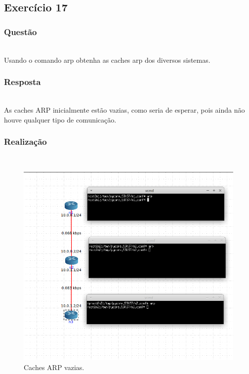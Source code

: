 \documentclass{llncs}
\begin{document}
\clearpage
\subsection{Exercício 17}
\subsubsection{Questão}\rule[-10pt]{0pt}{10pt}\\

Usando o comando arp obtenha as caches arp dos diversos sistemas.

\subsubsection{Resposta}\rule[-10pt]{0pt}{10pt}\\

As caches ARP inicialmente estão vazias, como seria de esperar, pois ainda não houve qualquer tipo de comunicação.

\subsubsection{Realização}\rule[-10pt]{0pt}{10pt}\\

\begin{figure}
  \begin{center}
    \includegraphics[scale=0.6]{./imagens/5.17.png} 
  \end{center}
  \caption{Caches ARP vazias.}
  \label{fig:arp_reply_resp}
\end{figure} 
\end{document}
